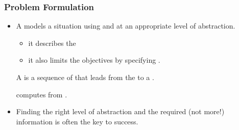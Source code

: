 \documentclass[notes,mh]{mikoslides}
\begin{document}
\begin{module}[id=problem-formulation]
\begin{frame}
  \frametitle{Problem Formulation}
  \begin{itemize}
  \item
    \begin{definition}[display=flow]
      A  models a situation using  and
       at an appropriate level of abstraction.
      \begin{itemize}
      \item it describes the 
      \item it also limits the objectives by specifying .
      \end{itemize}
      A  is a sequence of  that leads from the
       to a .

       computes  from
      .
    \end{definition}
  \item Finding the right level of abstraction and the required (not more!) information is
    often the key to success.
  \end{itemize}
\end{frame}
\end{module}
\end{document}
